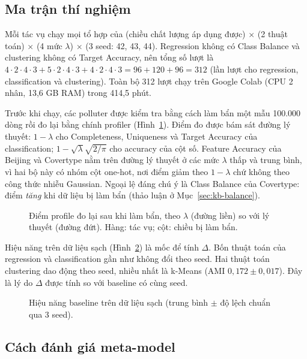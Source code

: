 \subsection{Ma trận thí nghiệm}

Mỗi tác vụ chạy mọi tổ hợp của (chiều chất lượng áp dụng được) $\times$ (2 thuật toán) $\times$ (4 mức $\lambda$) $\times$ (3 seed: 42, 43, 44). Regression không có Class Balance và clustering không có Target Accuracy, nên tổng số lượt là $4{\cdot}2{\cdot}4{\cdot}3 + 5{\cdot}2{\cdot}4{\cdot}3 + 4{\cdot}2{\cdot}4{\cdot}3 = 96 + 120 + 96 = 312$ (lần lượt cho regression, classification và clustering). Toàn bộ 312 lượt chạy trên Google Colab (CPU 2 nhân, 13,6 GB RAM) trong 414,5 phút.

Trước khi chạy, các polluter được kiểm tra bằng cách làm bẩn một mẫu 100.000 dòng rồi đo lại bằng chính profiler (Hình~\ref{fig:h1}). Điểm đo được bám sát đường lý thuyết: $1-\lambda$ cho Completeness, Uniqueness và Target Accuracy của classification; $1-\sqrt{\lambda}\sqrt{2/\pi}$ cho accuracy của cột số. Feature Accuracy của Beijing và Covertype nằm trên đường lý thuyết ở các mức $\lambda$ thấp và trung bình, vì hai bộ này có nhóm cột one-hot, nơi điểm giảm theo $1-\lambda$ chứ không theo công thức nhiễu Gaussian. Ngoại lệ đáng chú ý là Class Balance của Covertype: điểm \emph{tăng} khi dữ liệu bị làm bẩn (thảo luận ở Mục~\ref{sec:kb-balance}).

\begin{figure}[htbp]
\centering
{}
\caption{Điểm profile đo lại sau khi làm bẩn, theo $\lambda$ (đường liền) so với lý thuyết (đường đứt). Hàng: tác vụ; cột: chiều bị làm bẩn.}
\label{fig:h1}
\end{figure}

Hiệu năng trên dữ liệu sạch (Hình~\ref{fig:h2}) là mốc để tính $\Delta$. Bốn thuật toán của regression và classification gần như không đổi theo seed. Hai thuật toán clustering dao động theo seed, nhiều nhất là k-Means (AMI $0{,}172 \pm 0{,}017$). Đây là lý do $\Delta$ được tính so với baseline có cùng seed.

\begin{figure}[htbp]
\centering
{}
\caption{Hiệu năng baseline trên dữ liệu sạch (trung bình $\pm$ độ lệch chuẩn qua 3 seed).}
\label{fig:h2}
\end{figure}

\subsection{Cách đánh giá meta-model}
\label{sec:danh-gia}

